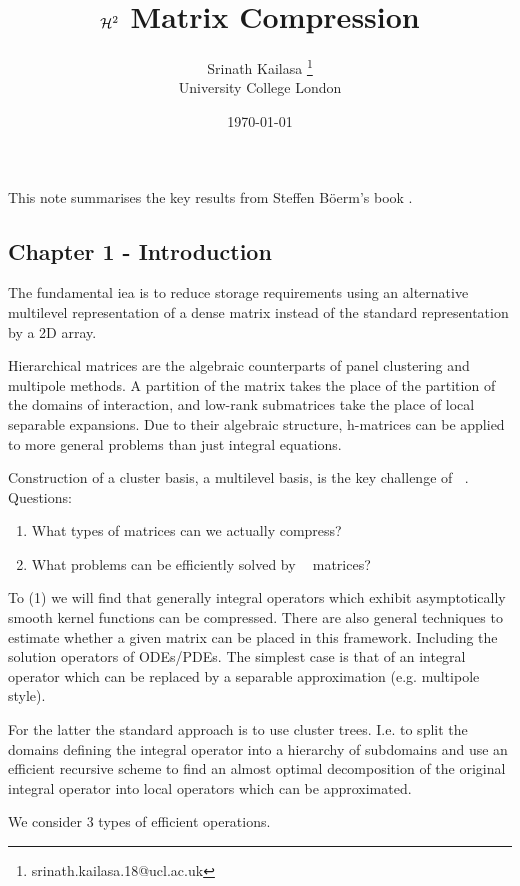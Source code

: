 \documentclass[12pt, a4, twoside]{article}
\title{$\htwomat$ Matrix Compression}
\author{Srinath Kailasa \thanks{srinath.kailasa.18@ucl.ac.uk} \\ \small University College London}
\date{\today}
\DeclareMathOperator\htwomat{\mathcal{H}^2}
\begin{document}
\maketitle

This note summarises the key results from Steffen B\"{o}erm's book \cite{borm2010efficient}.

\subsection{Chapter 1 - Introduction}

The fundamental iea is to reduce storage requirements using an alternative multilevel representation of a dense matrix instead of the standard representation by a 2D array.

Hierarchical matrices are the algebraic counterparts of panel clustering and multipole methods. A partition of the matrix takes the place of the partition of the domains of interaction, and low-rank submatrices take the place of local separable expansions. Due to their algebraic structure, h-matrices can be applied to more general problems than just integral equations.

Construction of a cluster basis, a multilevel basis, is the key challenge of $\htwomat$. Questions:

\begin{enumerate}
    \item What types of matrices can we actually compress?
    \item What problems can be efficiently solved by $\htwomat$ matrices? 
\end{enumerate}

To (1) we will find that generally integral operators which exhibit asymptotically smooth kernel functions can be compressed. There are also general techniques to estimate whether a given matrix can be placed in this framework. Including the solution operators of ODEs/PDEs. The simplest case is that of an integral operator which can be replaced by a separable approximation (e.g. multipole style).

For the latter the standard approach is to use cluster trees. I.e. to split the domains defining the integral operator into a hierarchy of subdomains and use an efficient recursive scheme to find an almost optimal decomposition of the original integral operator into local operators which can be approximated.

We consider 3 types of efficient operations.
\end{document}
